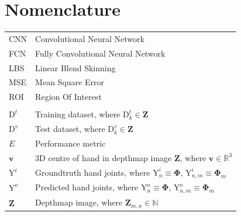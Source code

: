 \section*{\Huge{Nomenclature}}
\begin{tabular}{ll}
CNN & Convolutional Neural Network \\
FCN & Fully Convolutional Neural Network \\
LBS & Linear Blend Skinning \\
MSE & Mean Square Error \\
ROI & Region Of Interest \\
&\\
$\bm{\mathrm{D}}^t$ & Training dataset, where $\bm{\mathrm{D}}^t_k\in\bm{Z}$\\
$\bm{\mathrm{D}}^v$ & Test dataset, where $\bm{\mathrm{D}}^v_k\in\bm{Z}$\\
$E$ & Performance metric \\
$\bm{v}$ & 3D centre of hand in depthmap image $\bm{Z}$, where $\bm{v}\in \mathbb{R}^3$\\
$\bm{\mathrm{Y}}^{i}$ & Groundtruth hand joints, where $\bm{\mathrm{Y}}^{i}_{n} \equiv \bm{\Phi}$, $\bm{\mathrm{Y}}^{i}_{n,m} \equiv \bm{\Phi}_{m}$\\
$\bm{\mathrm{Y}}^{o}$ & Predicted hand joints, where $\bm{\mathrm{Y}}^{o}_{n} \equiv \bm{\Phi}$, $\bm{\mathrm{Y}}^{o}_{n,m} \equiv \bm{\Phi}_{m}$\\
$\bm{Z}$ & Depthmap image, where $\bm{Z}_{m,n} \in \mathbb{N}$ \\


\end{tabular}
